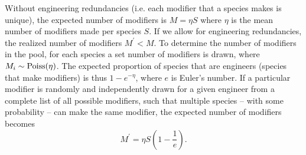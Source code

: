 \documentclass[twocolumn,preprintnumbers,amsmath,amssymb,superscriptaddress,linenumbers]{revtex4-1}
\newcommand{\rr}[1]{{\rm #1}}
\begin{document}
\begin{bibunit}

Without engineering redundancies (i.e. each modifier that a species makes is unique), the expected number of modifiers is $M = \eta S$ where $\eta$ is the mean number of modifiers made per species $S$.
If we allow for engineering redundancies, the realized number of modifiers $M^\prime < M$.
To determine the number of modifiers in the pool, for each species a set number of modifiers is drawn, where $M_i \sim {\rm Poiss}(\eta)$.
The expected proportion of species that are engineers (species that make modifiers) is thus $1-{e}^{-\eta}$, where $e$ is Euler's number.
If a particular modifier is randomly and independently drawn for a given engineer from a complete list of all possible modifiers, such that multiple species -- with some probability -- can make the same modifier, the expected number of modifiers becomes
\begin{equation}
M^\prime = \eta S \left(1 - \frac{1}{{e}}\right).
\label{eq:total}
\end{equation}


\end{bibunit}
\end{document}
